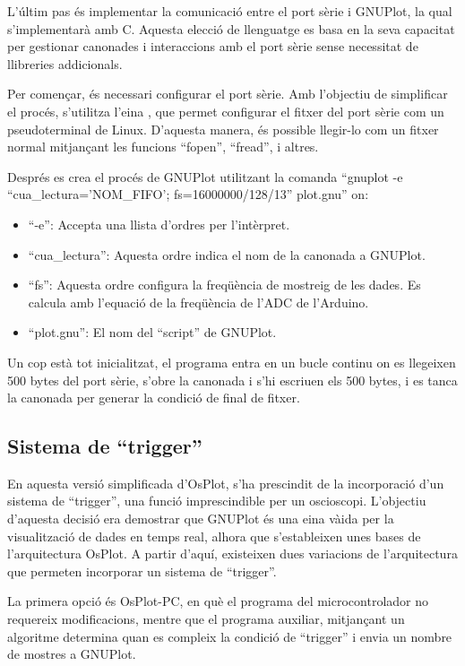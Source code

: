 \documentclass{tfgitic}[2023/06/30]
\begin{document}
L'últim pas és implementar la comunicació entre el port sèrie i
GNUPlot, la qual s'implementarà amb C. Aquesta elecció de llenguatge
es basa en la seva capacitat per gestionar canonades i interaccions
amb el port sèrie sense necessitat de llibreries addicionals.

Per començar, és necessari configurar el port sèrie. Amb l'objectiu de
simplificar el procés, s'utilitza l'eina \cite[stty]{stty}, que permet
configurar el fitxer del port sèrie com un pseudoterminal de
Linux. D'aquesta manera, és possible llegir-lo com un fitxer normal
mitjançant les funcions ``fopen'', ``fread'', i altres.

Després es crea el procés de GNUPlot utilitzant la comanda ``gnuplot
-e ``cua\_lectura='NOM\_FIFO'; fs=16000000/128/13'' plot.gnu'' on:
\begin{itemize}
      \item ``-e'': Accepta una llista d'ordres per l'intèrpret.
      \item ``cua\_lectura'': Aquesta ordre indica el nom de la
        canonada a GNUPlot.
      \item ``fs'': Aquesta ordre configura la freqüència de mostreig
        de les dades. Es calcula amb l'equació de la freqüència de
        l'ADC de l'Arduino.
      \item ``plot.gnu'': El nom del ``script'' de GNUPlot.
\end{itemize}

Un cop està tot inicialitzat, el programa entra en un bucle continu on
es llegeixen 500 bytes del port sèrie, s'obre la canonada i s'hi
escriuen els 500 bytes, i es tanca la canonada per generar la condició
de final de fitxer.

\subsection{Sistema de ``trigger''}

En aquesta versió simplificada d'OsPlot, s'ha prescindit de la
incorporació d'un sistema de ``trigger'', una funció imprescindible
per un osci\lgem oscopi. L'objectiu d'aquesta decisió era demostrar
que GNUPlot és una eina và\lgem ida per la visualització de dades en
temps real, alhora que s'estableixen unes bases de l'arquitectura
OsPlot. A partir d'aquí, existeixen dues variacions de l'arquitectura
que permeten incorporar un sistema de ``trigger''.

La primera opció és OsPlot-PC, en què el programa del microcontrolador
no requereix modificacions, mentre que el programa auxiliar,
mitjançant un algoritme determina quan es compleix la condició de
``trigger'' i envia un nombre de mostres a GNUPlot.
\end{document}
